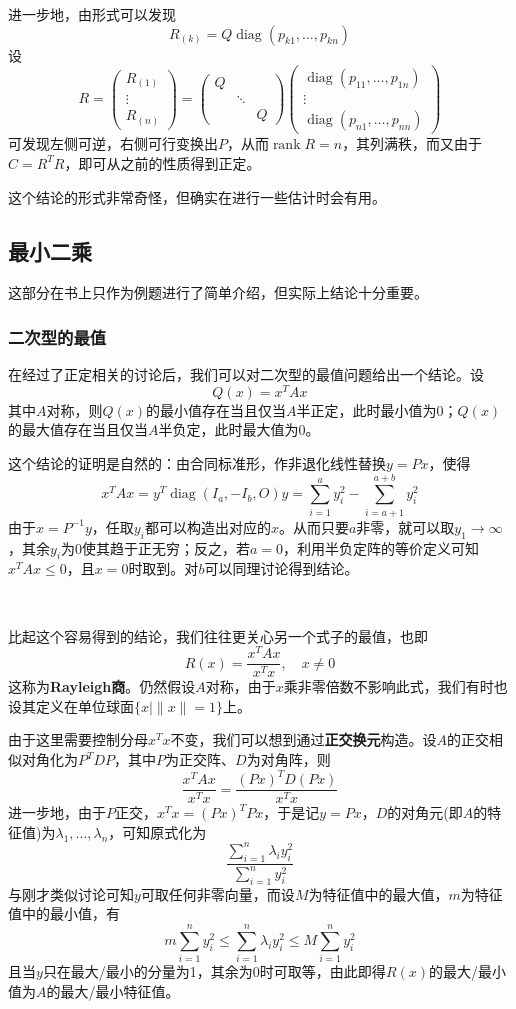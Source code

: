 \documentclass[a4paper,UTF8,fontset=windows]{ctexart}
\DeclareMathOperator{\diag}{diag}
\DeclareMathOperator{\rank}{rank}
\newcommand*{\note}{\noindent *}
\begin{document}
\begin{enumerate}
    进一步地，由形式可以发现
    $$R_{(k)}=Q\diag(p_{k1},\dots,p_{kn})$$
    设
    $$R=\begin{pmatrix}R_{(1)}\\\vdots\\R_{(n)}\end{pmatrix}=\begin{pmatrix}Q\\ &\ddots \\ &&Q\end{pmatrix}\begin{pmatrix}\diag(p_{11},\dots,p_{1n})\\\vdots\\\diag(p_{n1},\dots,p_{nn})\end{pmatrix}$$
    可发现左侧可逆，右侧可行变换出$P$，从而$\rank R=n$，其列满秩，而又由于$C=R^TR$，即可从之前的性质得到正定。

    \note 这个结论的形式非常奇怪，但确实在进行一些估计时会有用。
\end{enumerate}

\subsection{最小二乘}
\note 这部分在书上只作为例题进行了简单介绍，但实际上结论十分重要。
\subsubsection{二次型的最值}
在经过了正定相关的讨论后，我们可以对二次型的最值问题给出一个结论。设
$$Q(x)=x^TAx$$
其中$A$对称，则$Q(x)$的最小值存在当且仅当$A$半正定，此时最小值为0；$Q(x)$的最大值存在当且仅当$A$半负定，此时最大值为0。

这个结论的证明是自然的：由合同标准形，作非退化线性替换$y=Px$，使得
$$x^TAx=y^T\diag(I_a,-I_b,O)y=\sum_{i=1}^ay_i^2-\sum_{i=a+1}^{a+b}y_i^2$$
由于$x=P^{-1}y$，任取$y_i$都可以构造出对应的$x$。从而只要$a$非零，就可以取$y_1\to\infty$，其余$y_i$为0使其趋于正无穷；反之，若$a=0$，利用半负定阵的等价定义可知$x^TAx\le0$，且$x=0$时取到。对$b$可以同理讨论得到结论。


\

比起这个容易得到的结论，我们往往更关心另一个式子的最值，也即
$$R(x)=\frac{x^TAx}{x^Tx},\quad x\ne0$$
这称为\textbf{Rayleigh商}。仍然假设$A$对称，由于$x$乘非零倍数不影响此式，我们有时也设其定义在单位球面$\{x\mid\|x\|=1\}$上。

由于这里需要控制分母$x^Tx$不变，我们可以想到通过\textbf{正交换元}构造。设$A$的正交相似对角化为$P^TDP$，其中$P$为正交阵、$D$为对角阵，则
$$\frac{x^TAx}{x^Tx}=\frac{(Px)^TD(Px)}{x^Tx}$$
进一步地，由于$P$正交，$x^Tx=(Px)^TPx$，于是记$y=Px$，$D$的对角元(即$A$的特征值)为$\lambda_1,\dots,\lambda_n$，可知原式化为
$$\frac{\sum_{i=1}^n\lambda_iy_i^2}{\sum_{i=1}^ny_i^2}$$
与刚才类似讨论可知$y$可取任何非零向量，而设$M$为特征值中的最大值，$m$为特征值中的最小值，有
$$m\sum_{i=1}^ny_i^2\le\sum_{i=1}^n\lambda_iy_i^2\le M\sum_{i=1}^ny_i^2$$
且当$y$只在最大/最小的分量为1，其余为0时可取等，由此即得$R(x)$的最大/最小值为$A$的最大/最小特征值。
\end{document}

